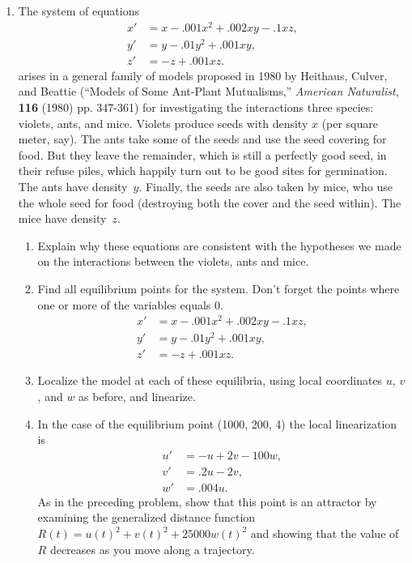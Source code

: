 \begin{enumerate}
\begin{enumerate}
\end{enumerate}
\item The system of equations
\begin{align*}
x' &= x - .001 x^2 + .002 x y -.1 x z, \\
y' &= y - .01 y ^2 + .001 x y, \\
z' &= -z + .001 x z.
\end{align*}
arises in a general family of models proposed in 1980 by Heithaus,
Culver, and Beattie (``Models of Some Ant-Plant Mutualisms,'' {\em
  American Naturalist}, {\bf 116} (1980) pp. 347-361) for
investigating the interactions three species: violets, ants, and mice.
Violets produce seeds with density $x$ (per square meter, say).  The
ants take some of the seeds and use the seed covering for food.  But
they leave the remainder, which is still a perfectly good seed, in
their refuse piles, which happily turn out to be good sites for
germination.  The ants have density~$y$.  Finally, the seeds are also
taken by mice, who use the whole seed for food (destroying both the
cover and the seed within). The mice have density~$z$.

  \begin{enumerate}
  \item Explain
why these equations are consistent with the hypotheses we made on the
interactions between the violets, ants and mice.

  \item Find all equilibrium points for the system.  Don't forget the
points where one or more of the variables equals 0.
\begin{align*}
x' &= x - .001 x^2 + .002 x y -.1 x z, \\
y' &= y - .01 y ^2 + .001 x y, \\
z' &= -z + .001 x z.
\end{align*}


  \item Localize the model at each of these equilibria, using local
coordinates $u$, $v$, and $w$ as before, and linearize.

  \item In the case of the equilibrium point (1000, 200, 4) the local
linearization is
\begin{align*}
u' &= -u + 2 v - 100 w, \\
v' &= .2 u - 2 v, \\
w' &= .004 u.
\end{align*}
As in the preceding problem, show that this point is an attractor by
examining the generalized distance function
$R(t)=u(t)^2+v(t)^2+25000w(t)^2$ and showing that the value of $R$
decreases as you move along a trajectory.


\end{enumerate}
\end{enumerate}
